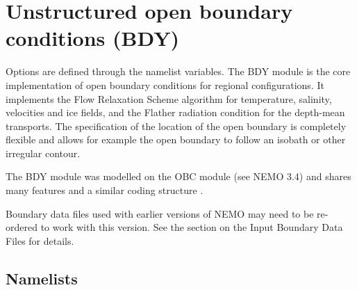 \documentclass[../tex_main/NEMO_manual]{subfiles}
\begin{document}
\section{Unstructured open boundary conditions (BDY)}
\label{sec:LBC_bdy}


Options are defined through the   
  namelist variables.
The BDY module is the core implementation of open boundary
conditions for regional configurations. It implements the Flow
Relaxation Scheme algorithm for temperature, salinity, velocities and
ice fields, and the Flather radiation condition for the depth-mean
transports. The specification of the location of the open boundary is
completely flexible and allows for example the open boundary to follow
an isobath or other irregular contour. 

The BDY module was modelled on the OBC module (see NEMO 3.4) and shares many
features and a similar coding structure \citep{Chanut2005}.

Boundary data files used with earlier versions of NEMO may need
to be re-ordered to work with this version. See the
section on the Input Boundary Data Files for details.

\subsection{Namelists}
\label{subsec:BDY_namelist}
\end{document}
